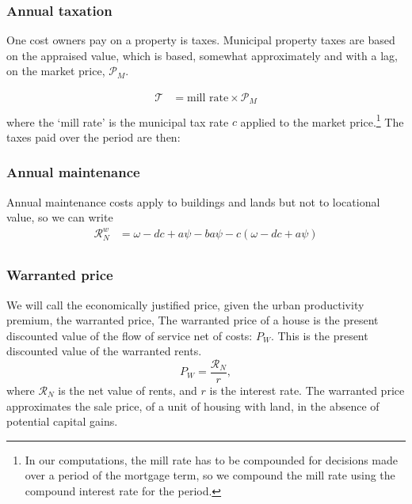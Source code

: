 

\subsubsection{Annual taxation}

One cost owners pay on a property is taxes. Municipal property taxes are based on the \gls{appraised value}, which is based, somewhat approximately and with a lag, on the \gls{market price}, $\mathcal{P}_M$. %

\begin{align*}
\mathcal{T} &= \text{mill rate} \times \mathcal{P}_M \\
\end{align*}
where the `\gls{mill rate}' is the municipal tax rate $c$ applied to the market price.\footnote{In our computations, the mill rate  has to be compounded for decisions made over a period of the mortgage term, so we compound the mill rate using the \gls{compound interest rate} for the period.} The taxes paid over the period are then:

\subsubsection{Annual maintenance}
Annual maintenance costs apply to buildings and lands but not to locational value, so we can write
 \begin{align}
\mathcal{R}_N^w &= \omega - {dc}  + a\psi -   ba\psi - c(\omega-{dc}+a\psi) \\
\end{align}

\subsubsection{Warranted price} \label{section-warranted-price}

We will call the economically justified price, given the urban productivity premium, the \gls{warranted price}, 
The \gls{warranted price} of a house is the present discounted value of the flow of service net of costs: $P_W$. This is the present discounted value of the warranted rents.
\begin{equation}
  P_W=\frac{\mathcal{R}_N}{r},  
\label{eqn-price-warranted}
\end{equation}
where $\mathcal{R}_N$ is the net value of rents, and $r$ is the interest rate.  The warranted price approximates the sale price, of a unit of housing with land, in the absence of potential capital gains. 


